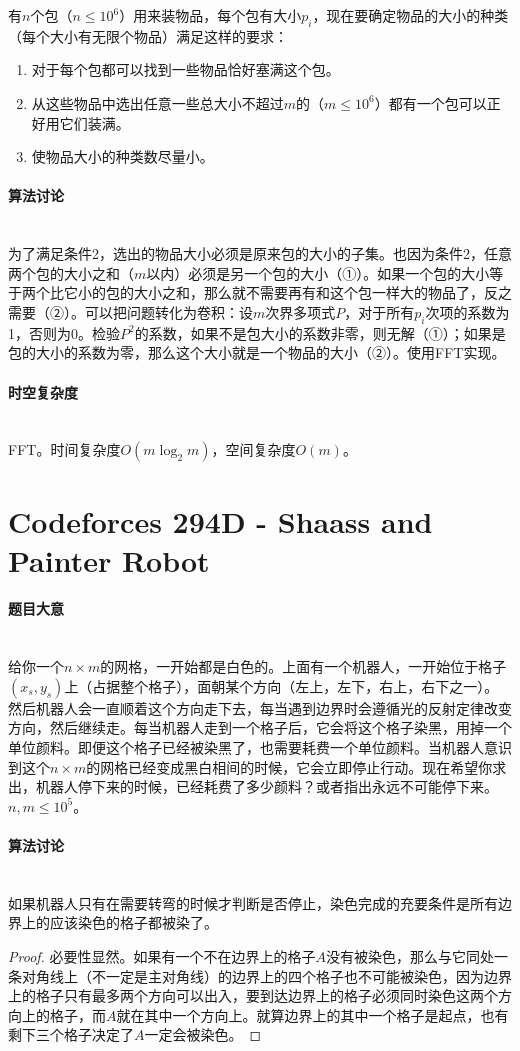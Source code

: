 \documentclass[UTF8]{ctexart}
\newcommand{\myparagraph}[1]{\paragraph{#1}\mbox{}\\}
\theoremstyle{nonumberplain}
\newtheorem{proof}{\hspace{1em}证明：}
\begin{document}
			有$n$个包（$n \leq 10^6$）用来装物品，每个包有大小$p_i$，现在要确定物品的大小的种类（每个大小有无限个物品）满足这样的要求：
			
			\begin{enumerate}
				\item 对于每个包都可以找到一些物品恰好塞满这个包。
				\item 从这些物品中选出任意一些总大小不超过$m$的（$m \leq 10^6$）都有一个包可以正好用它们装满。
				\item 使物品大小的种类数尽量小。
			\end{enumerate}
		
		\myparagraph{算法讨论}
		
			为了满足条件2，选出的物品大小必须是原来包的大小的子集。也因为条件2，任意两个包的大小之和（$m$以内）必须是另一个包的大小（①）。如果一个包的大小等于两个比它小的包的大小之和，那么就不需要再有和这个包一样大的物品了，反之需要（②）。可以把问题转化为卷积：设$m$次界多项式$P$，对于所有$p_i$次项的系数为1，否则为0。检验$P^2$的系数，如果不是包大小的系数非零，则无解（①）；如果是包的大小的系数为零，那么这个大小就是一个物品的大小（②）。使用FFT实现。
		
		\myparagraph{时空复杂度}
		
			FFT。时间复杂度$O(m\log_2m)$，空间复杂度$O(m)$。
	
	\section{Codeforces 294D - Shaass and Painter Robot}
	
		\myparagraph{题目大意}
		
			给你一个$n \times m$的网格，一开始都是白色的。上面有一个机器人，一开始位于格子$(x_s,y_s)$上（占据整个格子），面朝某个方向（左上，左下，右上，右下之一）。然后机器人会一直顺着这个方向走下去，每当遇到边界时会遵循光的反射定律改变方向，然后继续走。每当机器人走到一个格子后，它会将这个格子染黑，用掉一个单位颜料。即便这个格子已经被染黑了，也需要耗费一个单位颜料。当机器人意识到这个$n \times m$的网格已经变成黑白相间的时候，它会立即停止行动。现在希望你求出，机器人停下来的时候，已经耗费了多少颜料？或者指出永远不可能停下来。$n,m \leq 10^5$。
			
		\myparagraph{算法讨论}
		
			如果机器人只有在需要转弯的时候才判断是否停止，染色完成的充要条件是所有边界上的应该染色的格子都被染了。
			
			\begin{proof}必要性显然。如果有一个不在边界上的格子$A$没有被染色，那么与它同处一条对角线上（不一定是主对角线）的边界上的四个格子也不可能被染色，因为边界上的格子只有最多两个方向可以出入，要到达边界上的格子必须同时染色这两个方向上的格子，而$A$就在其中一个方向上。就算边界上的其中一个格子是起点，也有剩下三个格子决定了$A$一定会被染色。\end{proof}
			
\end{document}
